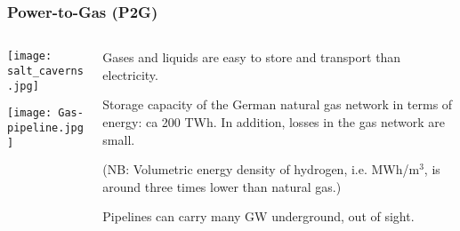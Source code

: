 \documentclass[10pt,aspectratio=169,dvipsnames]{beamer}
\begin{document}
\begin{frame}
  \frametitle{Power-to-Gas (P2G)}

  \begin{columns}[T]
    \begin{column}{4.5cm}
      \texttt{[image: salt\_caverns.jpg]}

      \vspace{.4cm}

      \texttt{[image: Gas-pipeline.jpg]}
    \end{column}

    \begin{column}{5cm}
      Gases and liquids are easy to \alert{store} and \alert{transport} than electricity.

      Storage capacity of the German natural gas network in terms of energy: ca 200 TWh. In addition, losses in the gas network are small.

   (NB: Volumetric energy density of hydrogen, i.e. MWh/m$^3$, is around three times lower than natural gas.)

      Pipelines can carry many GW underground, out of sight.
    \end{column}

\end{columns}

\end{frame}
\end{document}
